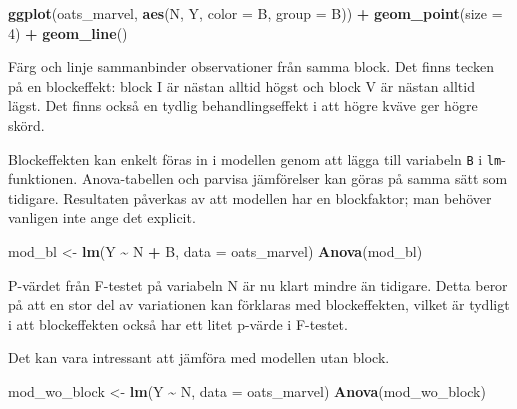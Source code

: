 \documentclass[
]{book}
\newenvironment{Shaded}{\begin{snugshade}}{\end{snugshade}}
\newcommand{\AttributeTok}[1]{\textcolor[rgb]{0.13,0.29,0.53}{#1}}
\newcommand{\DecValTok}[1]{\textcolor[rgb]{0.00,0.00,0.81}{#1}}
\newcommand{\FunctionTok}[1]{\textcolor[rgb]{0.13,0.29,0.53}{\textbf{#1}}}
\newcommand{\NormalTok}[1]{#1}
\newcommand{\OtherTok}[1]{\textcolor[rgb]{0.56,0.35,0.01}{#1}}
\newcommand{\SpecialCharTok}[1]{\textcolor[rgb]{0.81,0.36,0.00}{\textbf{#1}}}
\theoremstyle{definition}
\theoremstyle{definition}
\theoremstyle{definition}
\theoremstyle{definition}
\theoremstyle{remark}
\begin{document}
\begin{Shaded}
\begin{Highlighting}[]
\FunctionTok{ggplot}\NormalTok{(oats\_marvel, }\FunctionTok{aes}\NormalTok{(N, Y, }\AttributeTok{color =}\NormalTok{ B, }\AttributeTok{group =}\NormalTok{ B)) }\SpecialCharTok{+}
  \FunctionTok{geom\_point}\NormalTok{(}\AttributeTok{size =} \DecValTok{4}\NormalTok{) }\SpecialCharTok{+}
  \FunctionTok{geom\_line}\NormalTok{()}
\end{Highlighting}
\end{Shaded}

Färg och linje sammanbinder observationer från samma block. Det finns tecken på en blockeffekt: block I är nästan alltid högst och block V är nästan alltid lägst. Det finns också en tydlig behandlingseffekt i att högre kväve ger högre skörd.

Blockeffekten kan enkelt föras in i modellen genom att lägga till variabeln \texttt{B} i \texttt{lm}-funktionen. Anova-tabellen och parvisa jämförelser kan göras på samma sätt som tidigare. Resultaten påverkas av att modellen har en blockfaktor; man behöver vanligen inte ange det explicit.

\begin{Shaded}
\begin{Highlighting}[]
\NormalTok{mod\_bl }\OtherTok{\textless{}{-}} \FunctionTok{lm}\NormalTok{(Y }\SpecialCharTok{\textasciitilde{}}\NormalTok{ N }\SpecialCharTok{+}\NormalTok{ B, }\AttributeTok{data =}\NormalTok{ oats\_marvel)}
\FunctionTok{Anova}\NormalTok{(mod\_bl)}
\end{Highlighting}
\end{Shaded}

P-värdet från F-testet på variabeln N är nu klart mindre än tidigare. Detta beror på att en stor del av variationen kan förklaras med blockeffekten, vilket är tydligt i att blockeffekten också har ett litet p-värde i F-testet.

Det kan vara intressant att jämföra med modellen utan block.

\begin{Shaded}
\begin{Highlighting}[]
\NormalTok{mod\_wo\_block }\OtherTok{\textless{}{-}} \FunctionTok{lm}\NormalTok{(Y }\SpecialCharTok{\textasciitilde{}}\NormalTok{ N, }\AttributeTok{data =}\NormalTok{ oats\_marvel)}
\FunctionTok{Anova}\NormalTok{(mod\_wo\_block)}
\end{Highlighting}
\end{Shaded}
\end{document}
